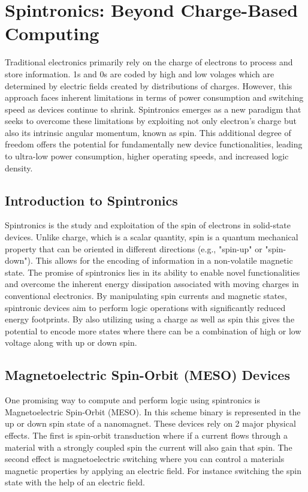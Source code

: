 \documentclass[sigconf,authordraft]{acmart}
\begin{document}
\section{Spintronics: Beyond Charge-Based Computing}
Traditional electronics primarily rely on the charge of electrons 
to process and store information. 1s and 0s are coded by high and 
low volages which are determined by electric fields created by
distributions of charges. However, this approach faces inherent 
limitations in terms of power consumption and switching speed as 
devices continue to shrink. Spintronics emerges as a new paradigm 
that seeks to overcome these limitations by exploiting not only electron's 
charge but also its intrinsic angular momentum, known as spin. 
This additional degree of freedom offers the potential for 
fundamentally new device functionalities, leading to 
ultra-low power consumption, higher operating speeds, and increased 
logic density.

\subsection{Introduction to Spintronics}
Spintronics is the study and exploitation of the spin 
of electrons in solid-state devices. Unlike charge, which is a 
scalar quantity, spin is a quantum mechanical property that can 
be oriented in different directions (e.g., "spin-up" or "spin-down").
This allows for the encoding of information in a non-volatile magnetic
state. The promise of spintronics lies in its ability to enable 
novel functionalities and overcome the inherent energy dissipation 
associated with moving charges in conventional electronics. By manipulating 
spin currents and magnetic states, spintronic devices aim to perform logic 
operations with significantly reduced energy footprints. 
By also utilizing using a charge as well as spin this gives the potential to encode more 
states where there can be a combination of high or low voltage along 
with up or down spin. 


\subsection{Magnetoelectric Spin-Orbit (MESO) Devices} 
One promising way to compute and perform logic using spintronics is 
Magnetoelectric Spin-Orbit (MESO). In this scheme binary is represented 
in the up or down spin state of a nanomagnet. These devices rely 
on 2 major physical effects. The first is spin-orbit transduction where 
if a current flows through a material with a strongly coupled spin 
the current will also gain that spin. The second effect is magnetoelectric 
switching where you can control a materials magnetic properties by applying 
an electric field. For instance switching the spin state with the help of 
an electric field.
\end{document}
